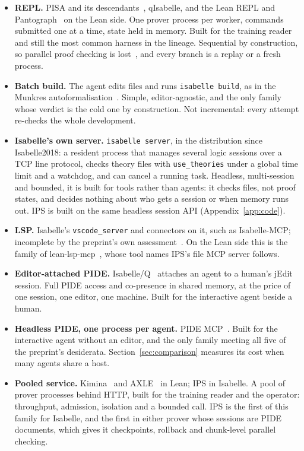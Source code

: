 \documentclass[11pt]{article}
\newcommand{\code}[1]{\colorbox{gray!12}{\texttt{\vphantom{Ag}#1}}}
\begin{document}
\begin{itemize}
  \item \textbf{REPL.} PISA and its descendants~\cite{jiang2021lisa},
    qIsabelle, and the Lean REPL and Pantograph~\cite{aniva2025pantograph}
    on the Lean side. One prover process per worker, commands submitted
    one at a time, state held in memory. Built for the training reader
    and still the most common harness in the lineage. Sequential by
    construction, so parallel proof checking is lost~\cite{wenzel2012repl},
    and every branch is a replay or a fresh process.
  \item \textbf{Batch build.} The agent edits files and runs
    \code{isabelle build}, as in the Munkres
    autoformalisation~\cite{bryant2026munkres}. Simple, editor-agnostic,
    and the only family whose verdict is the cold one by construction.
    Not incremental: every attempt re-checks the whole development.
  \item \textbf{Isabelle's own server.} \code{isabelle server}, in the
    distribution since Isabelle2018: a resident process that manages
    several logic sessions over a TCP line protocol, checks theory files
    with \code{use\_theories} under a global time limit and a watchdog,
    and can cancel a running task. Headless, multi-session and bounded,
    it is built for tools rather than agents: it checks files, not proof
    states, and decides nothing about who gets a session or when memory
    runs out. IPS is built on the same headless session API
    (Appendix~\ref{app:code}).
  \item \textbf{LSP.} Isabelle's \code{vscode\_server} and connectors
    on it, such as Isabelle-MCP; incomplete by the preprint's own
    assessment~\cite{kappelmann2026pidemcp}. On the Lean side this is the
    family of lean-lsp-mcp~\cite{dressler2026leanlspmcp}, whose tool names
    IPS's file MCP server follows.
  \item \textbf{Editor-attached PIDE.} Isabelle/Q~\cite{awslabs2026autocorrode}
    attaches an agent to a human's jEdit session. Full PIDE access and
    co-presence in shared memory, at the price of one session, one
    editor, one machine. Built for the interactive agent beside a human.
  \item \textbf{Headless PIDE, one process per agent.} PIDE
    MCP~\cite{kappelmann2026pidemcp}. Built for the interactive agent
    without an editor, and the only family meeting all five of the
    preprint's desiderata. Section~\ref{sec:comparison} measures its cost
    when many agents share a host.
  \item \textbf{Pooled service.} Kimina~\cite{santos2025kimina} and
    AXLE~\cite{xin2026axle} in Lean; IPS in Isabelle. A pool of prover
    processes behind HTTP, built for the training reader and the
    operator: throughput, admission, isolation and a bounded call. IPS is
    the first of this family for Isabelle, and the first in either prover
    whose sessions are PIDE documents, which gives it checkpoints,
    rollback and chunk-level parallel checking.
\end{itemize}
\end{document}
